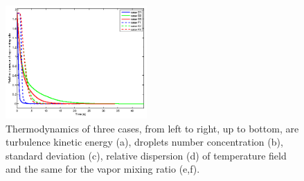 \documentclass[draft,jgrga]{AGUTeX}
\begin{document}
\begin{article}
\begin{figure}
\includegraphics[width=0.48\textwidth]{Figures/vapor_dsp}
\caption{Thermodynamics of three cases, from left to right, up to bottom, are turbulence kinetic 
energy (a), droplets number concentration (b), standard deviation (c), relative dispersion (d) of temperature field and the same for the vapor mixing ratio (e,f).\label{fig:therm_dynam}}
\end{figure}


\end{article}
\end{document}
